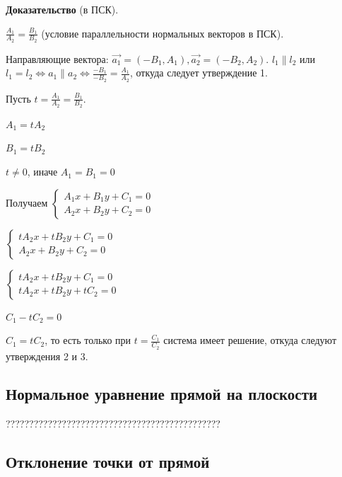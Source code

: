 \documentclass[a4paper]{article}
\begin{document}
\begin{hproof}
\textbf{Доказательство} (в ПСК).

$\displaystyle \frac{A_1}{A_2} = \frac{B_1}{B_2}$ (условие параллельности нормальных векторов в ПСК). 

Направляющие вектора: $\vec{a_1} = (-B_1, A_1), \vec{a_2} = (-B_2, A_2)$. \newline $l_1 \parallel l_2$ или $\displaystyle l_1 = l_2 \Leftrightarrow a_1 \parallel a_2 \Leftrightarrow \frac{-B_1}{-B_2} = \frac{A_1}{A_2}$, откуда следует утверждение 1.

Пусть $t = \frac{A_1}{A_2} = \frac{B_1}{B_2}$. 

$A_1 = tA_2$

$B_1 = tB_2$

$t \neq 0$, иначе $A_1 = B_1 = 0$

Получаем $
\begin{cases}
   A_1x+B_1y+C_1 = 0
   \\
   A_2x + B_2y+C_2 = 0
 \end{cases}
$

$
\begin{cases}
   tA_2x+tB_2y+C_1 = 0
   \\
   A_2x + B_2y+C_2 = 0
 \end{cases}
$

$
\begin{cases}
   tA_2x+tB_2y+C_1 = 0
   \\
   tA_2x + tB_2y+tC_2 = 0
 \end{cases}
$

$C_1 - tC_2 = 0$

$C_1 = tC_2$, то есть только при $\displaystyle t=\frac{C_1}{C_2}$ система имеет решение, откуда следуют утверждения 2 и 3.
\end{hproof}


\newpage \begin{center}\begin{Large}\end{Large}\end{center}
\subsection*{Нормальное уравнение прямой на плоскости}
??????????????????????????????????????????????

\subsection*{Отклонение точки от прямой}
\end{document}
